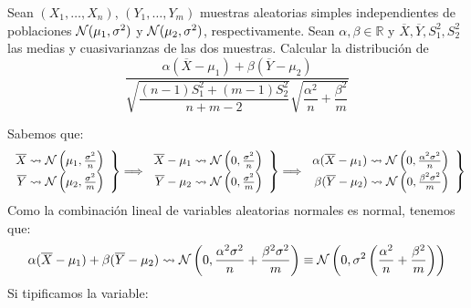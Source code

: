 \begin{ejercicio}
    Sean $(X_1, \ldots, X_n)$, $(Y_1, \ldots, Y_m)$ muestras aleatorias simples independientes de poblaciones $\mathcal{N}(\mu_1,\sigma^2)$ y $\mathcal{N}(\mu_2, \sigma^2)$, respectivamente. Sean $\alpha,\beta\in \mathbb{R}$ y $\overline{X},\overline{Y},S_1^2, S_2^2$ las medias y cuasivarianzas de las dos muestras. Calcular la distribución de
    \begin{equation*}
        \dfrac{\alpha\left(\overline{X}-\mu_1\right)+\beta\left(\overline{Y}-\mu_2\right)}{\sqrt{\dfrac{(n-1)S_1^2 + (m-1)S_2^2}{n+m-2}} \sqrt{\dfrac{\alpha^2}{n} + \dfrac{\beta^2}{m}}}
    \end{equation*}

    \noindent
    Sabemos que:
    \begin{equation*}
        \left.\begin{array}{r}
                \overline{X} \rightsquigarrow\mathcal{N}\left(\mu_1, \frac{\sigma^2}{n}\right) \\
                \overline{Y} \rightsquigarrow\mathcal{N}\left(\mu_2, \frac{\sigma^2}{m}\right) 
        \end{array}\right\} \Longrightarrow 
        \left.\begin{array}{r}
                \overline{X}-\mu_1 \rightsquigarrow\mathcal{N}\left(0, \frac{\sigma^2}{n}\right) \\
                \overline{Y}-\mu_2 \rightsquigarrow\mathcal{N}\left(0, \frac{\sigma^2}{m}\right) 
        \end{array}\right\} \Longrightarrow 
        \left.\begin{array}{r}
                \alpha(\overline{X}-\mu_1 )\rightsquigarrow\mathcal{N}\left(0, \frac{\alpha^2\sigma^2}{n}\right) \\
                \beta(\overline{Y}-\mu_2 )\rightsquigarrow\mathcal{N}\left(0, \frac{\beta^2\sigma^2}{m}\right) 
        \end{array}\right\} 
    \end{equation*}
    Como la combinación lineal de variables aleatorias normales es normal, tenemos que:
    \begin{equation*}
        \alpha(\overline{X}-\mu_1 ) +\beta(\overline{Y}-\mu_2 ) \rightsquigarrow \mathcal{N}\left(0, \dfrac{\alpha^2\sigma^2}{n} + \dfrac{\beta^2\sigma^2}{m}\right) \equiv \mathcal{N}\left(0, \sigma^2\left(\frac{\alpha^2}{n}+\frac{\beta^2}{m}\right) \right) 
    \end{equation*}
    Si tipificamos la variable:
    \begin{equation*}

\end{equation*}
\end{ejercicio}
